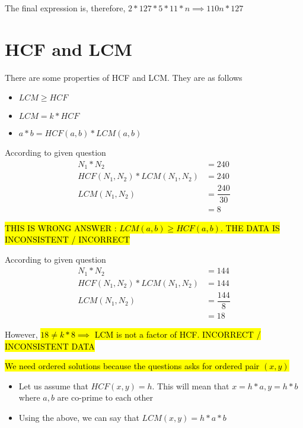 The final expression is, therefore, $2 * 127 *  5 * 11 * n \implies 110n * 127$

\section{HCF and LCM}
There are some properties of HCF and LCM. They are as follows
\begin{itemize}
    \item $LCM \geq HCF$
    \item $LCM = k * HCF$
    \item $a * b = HCF(a,b) * LCM(a,b)$
\end{itemize}

According to given question
\begin{align*}
    N_1 * N_2 &= 240 \\
    HCF(N_1,N_2) * LCM(N_1,N_2) &= 240 \\
    LCM(N_1,N_2) &= \dfrac{240}{30} \\
    &= 8
\end{align*}

\hl{THIS IS WRONG ANSWER : $LCM(a,b) \geq HCF(a,b)$. THE DATA IS INCONSISTENT / INCORRECT}


According to given question
\begin{align*}
    N_1 * N_2 &= 144 \\
    HCF(N_1,N_2) * LCM(N_1,N_2) &= 144 \\
    LCM(N_1,N_2) &= \dfrac{144}{8} \\
    &= 18
\end{align*}

However, \hl{$18 \neq k * 8 \implies$ LCM is not a factor of HCF. INCORRECT / INCONSISTENT DATA}


\hl{We need ordered solutions because the questions asks for ordered pair $(x,y)$}

\begin{itemize}
    \item Let us assume that $HCF(x,y) = h$. This will mean that $x = h * a, y = h * b$ where $a,b$ are co-prime to each other
    \item Using the above, we can say that $LCM(x,y) = h * a * b$
\end{itemize}

